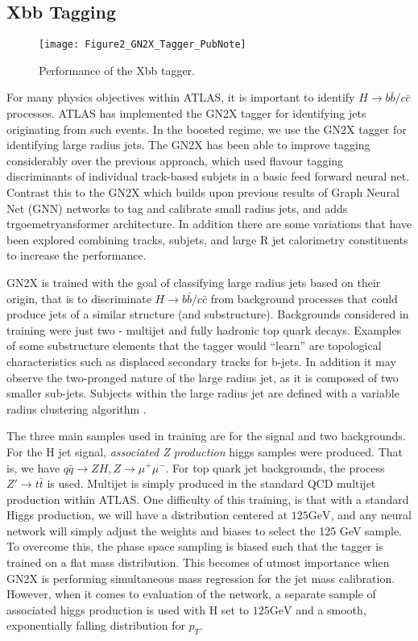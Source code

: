 \documentclass[12pt]{article}
\begin{document}
\subsection{Xbb Tagging}
\begin{figure}[t]
    \centering
    \texttt{[image: Figure2\_GN2X\_Tagger\_PubNote]}
    \caption{Performance of the Xbb tagger.}
    \label{fig:Xbb_tagger}
\end{figure}

For many physics objectives within ATLAS, it is important to identify
$H\rightarrow b\bar{b} / c\bar{c}$ processes. ATLAS has implemented the GN2X tagger
for identifying jets originating from such events. In the boosted regime, we use
the GN2X tagger for identifying large radius jets. The GN2X has been able to
improve tagging considerably over the previous approach, which used flavour
tagging discriminants of individual track-based subjets in a basic feed forward
neural net. Contrast this to the GN2X which builds upon previous results of
Graph Neural Net (GNN) networks to tag and calibrate small radius jets, and adds
trgoemetryansformer architecture. In addition there are some variations that have been
explored combining tracks, subjets, and large R jet calorimetry constituents to
increase the performance.

GN2X is trained with the goal of classifying large radius jets based on their
origin, that is to discriminate $H\rightarrow b\bar{b}/c\bar{c}$ from background
processes that could produce jets of a similar structure (and substructure).
Backgrounds considered in training were just two - multijet and fully hadronic
top quark decays. Examples of some substructure elements that the tagger would
``learn'' are topological characteristics such as displaced secondary tracks for
b-jets. In addition it may observe the two-pronged nature of the large radius
jet, as it is composed of two smaller sub-jets. Subjects within the large radius
jet are defined with a variable radius clustering algorithm
\cite{jet_substructure}.

The three main samples used in training are for the signal and two backgrounds.
For the H jet signal, \textit{associated Z production} higgs samples were
produced. That is, we have $q\bar{q}\rightarrow ZH, Z\rightarrow \mu^+\mu^-$.
For top quark jet backgrounds, the process $Z'\rightarrow t\bar{t}$ is used.
Multijet is simply produced in the standard QCD multijet production within
ATLAS. One difficulty of this training, is that with a standard Higgs
production, we will have a distribution centered at $125 \text{GeV}$, and any
neural network will simply adjust the weights and biases to select the 125 GeV
sample. To overcome this, the phase space sampling is biased such that the
tagger is trained on a flat mass distribution. This becomes of utmost importance
when GN2X is performing simultaneous mass regression for the jet mass
calibration. However, when it comes to evaluation of the network, a separate
sample of associated higgs production is used with H set to $125 \text{GeV}$ and
a smooth, exponentially falling distribution for $p_T$.
\end{document}
